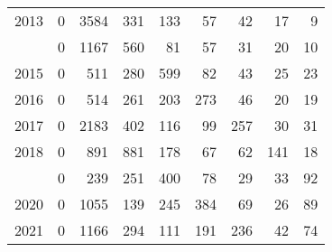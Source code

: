 \documentclass[
]{article}
\begin{document}
\begin{longtable}[t]{lrrrrrrrr}
2013 & 0 & 3584 & 331 & 133 & 57 & 42 & 17 & 9\\
\addlinespace
2014 & 0 & 1167 & 560 & 81 & 57 & 31 & 20 & 10\\
2015 & 0 & 511 & 280 & 599 & 82 & 43 & 25 & 23\\
2016 & 0 & 514 & 261 & 203 & 273 & 46 & 20 & 19\\
2017 & 0 & 2183 & 402 & 116 & 99 & 257 & 30 & 31\\
2018 & 0 & 891 & 881 & 178 & 67 & 62 & 141 & 18\\
\addlinespace
2019 & 0 & 239 & 251 & 400 & 78 & 29 & 33 & 92\\
2020 & 0 & 1055 & 139 & 245 & 384 & 69 & 26 & 89\\
2021 & 0 & 1166 & 294 & 111 & 191 & 236 & 42 & 74\\*
\end{longtable}
\end{document}
